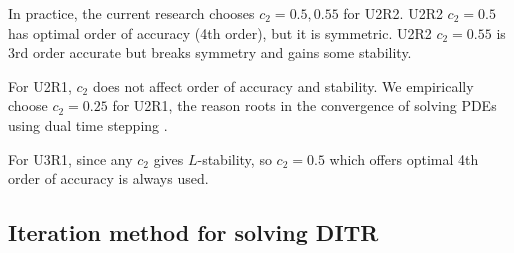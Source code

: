 In practice, the current research chooses $c_2=0.5,0.55$ for U2R2.
U2R2 $c_2=0.5$ has optimal order of accuracy (4th order), but it is symmetric.
U2R2 $c_2=0.55$ is 3rd order accurate but breaks symmetry and gains some stability.

For U2R1, $c_2$ does not affect order of accuracy and stability.
We empirically choose $c_2=0.25$ for U2R1, the reason roots in
the convergence of solving PDEs using
dual time stepping
.

For U3R1, since any $c_2$ gives $L$-stability, so $c_2=0.5$ which
offers optimal 4th order of accuracy is always used.

\subsection{Iteration method for solving DITR}


